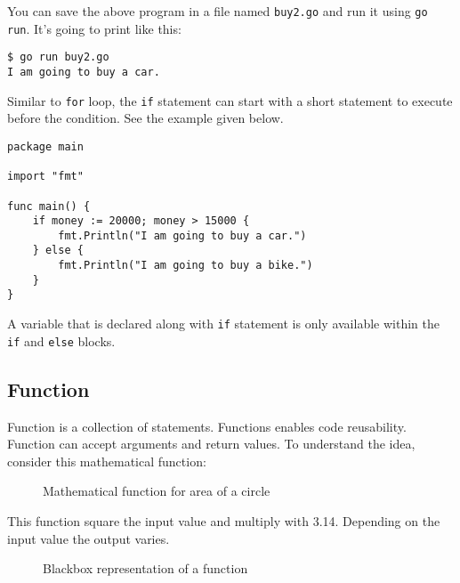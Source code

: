 You can save the above program in a file named \texttt{buy2.go} and
run it using \texttt{go run}.  It's going to print like this:

\begin{lstlisting}[numbers=none]
$ go run buy2.go
I am going to buy a car.
\end{lstlisting}

Similar to \texttt{for} loop, the \texttt{if} statement can start with
a short statement to execute before the condition.  See the example
given below.

\begin{lstlisting}[caption=If with initialization statement]
package main

import "fmt"

func main() {
    if money := 20000; money > 15000 {
        fmt.Println("I am going to buy a car.")
    } else {
        fmt.Println("I am going to buy a bike.")
    }
}
\end{lstlisting}

A variable that is declared along with \texttt{if} statement is only
available within the \texttt{if} and \texttt{else} blocks.

\subsection{Function}

Function is a collection of statements.  Functions
enables code reusability.  Function can accept arguments and return
values.  To understand the idea, consider this mathematical function:

\begin{figure}[h!]
\centering
{}
\caption{Mathematical function for area of a circle}
\end{figure}

This function square the input value and multiply with 3.14.
Depending on the input value the output varies.

\begin{figure}[h!]
\centering
{}
\caption{Blackbox representation of a function}
\end{figure}

